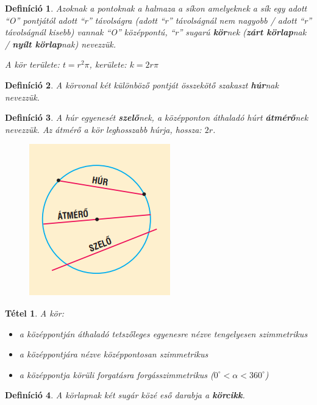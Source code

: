 \documentclass[12pt,a4paper]{article}
\newtheorem{theorem}{Tétel} [section]
\newtheorem{definition}{Definíció} [section]
\begin{document}
\begin{definition}
Azoknak a pontoknak a halmaza a síkon amelyeknek a sík egy adott ``O'' pontjától adott ``r'' távolságra (adott ``r'' távolságnál nem nagyobb / adott ``r'' távolságnál kisebb) vannak ``O'' középpontú, ``r'' sugarú \textbf{kör}nek (\textbf{zárt körlap}nak / \textbf{nyílt körlap}nak) nevezzük.

A kör területe: $t=r^2\pi$, kerülete: $k=2r\pi$
\end{definition}

\begin{definition}
A körvonal két különböző pontját összekötő szakaszt \textbf{húr}nak nevezzük.
\end{definition}

\begin{definition}
A húr egyenesét \textbf{szelő}nek, a középponton áthaladó húrt \textbf{átmérő}nek nevezzük. Az átmérő a kör leghosszabb húrja, hossza: $2r$.
\end{definition}
\begin{figure}[h]
\centering
\includegraphics[scale=0.4]{geometry/atmero}
\end{figure}

\begin{theorem}
A kör:
\begin{itemize}
\item a középpontján áthaladó tetszőleges egyenesre nézve tengelyesen szimmetrikus
\item a középpontjára nézve középpontosan szimmetrikus
\item a középpontja körüli forgatásra forgásszimmetrikus ($0^\circ<\alpha<360^\circ$)
\end{itemize}
\end{theorem}

\begin{definition}
A körlapnak két sugár közé eső darabja a \textbf{körcikk}.
\end{definition}
\end{document}
